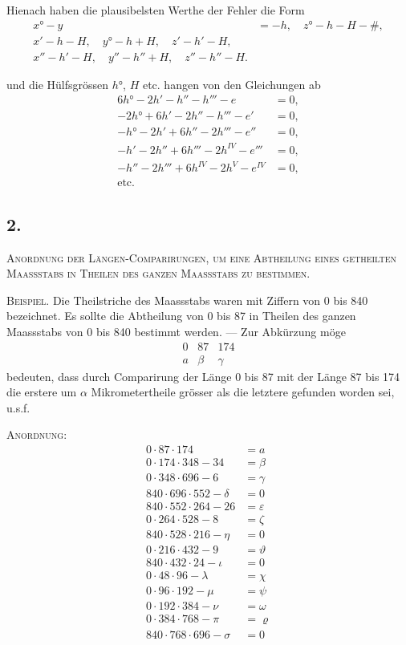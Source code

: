\documentclass[fontsize=10pt,paper=a5,pagesize=auto]{scrbook}
\newcommand{\origpage}[1]{\marginpar{\footnotesize\textit{S. #1}}}
\begin{document}
Hienach haben die plausibelsten Werthe der Fehler die Form
\begin{align*}
x° - y &= -h, \quad z° - h - H - \#,\\
x' - h - H, \quad y° - h + H, \quad z' - h' - H,\\
x'' - h' - H, \quad y'' - h'' + H, \quad z'' - h'' - H.
\end{align*}

\origpage{639}
und die Hülfsgrössen $h°$, $H$ etc. hangen von den Gleichungen ab
\begin{align*}
6h° - 2h' - h'' - h''' - e &= 0,\\
-2h° + 6h' - 2h'' - h''' - e' &= 0,\\
-h° - 2h' + 6h'' - 2h''' - e'' &= 0,\\
-h' - 2h'' + 6h''' - 2h^{IV} - e''' &= 0,\\
-h'' - 2h''' + 6h^{IV} - 2h^{V} - e^{IV} &= 0,\\
\text{etc.}&
\end{align*}

\subsection*{2.}
\origpage{639}
\textsc{Anordnung der Längen-Comparirungen, um eine Abtheilung eines getheilten Maassstabs in Theilen des ganzen Maassstabs zu bestimmen.}

\textsc{Beispiel.} Die Theilstriche des Maassstabs waren mit Ziffern von 0 bis 840 bezeichnet. Es sollte die Abtheilung von 0 bis 87 in Theilen des ganzen Maassstabs von 0 bis 840 bestimmt werden. --- Zur Abkürzung möge
\[
\begin{array}{ccc}
0 & 87 & 174 \\
\hline
a & \beta & \gamma
\end{array}
\]
bedeuten, dass durch Comparirung der Länge 0 bis 87 mit der Länge 87 bis 174 die erstere um $\alpha$ Mikrometertheile grösser als die letztere gefunden worden sei, u.s.f.

\textsc{Anordnung:}
\begin{align*}
0 \cdot 87 \cdot 174 &= a\\
0 \cdot 174 \cdot 348 - 34 &= \beta\\
0 \cdot 348 \cdot 696 - 6 &= \gamma\\
840 \cdot 696 \cdot 552 - \delta &= 0\\
840 \cdot 552 \cdot 264 - 26 &= \varepsilon\\
0 \cdot 264 \cdot 528 - 8 &= \zeta\\
840 \cdot 528 \cdot 216 - \eta &= 0\\
0 \cdot 216 \cdot 432 - 9 &= \vartheta\\
840 \cdot 432 \cdot 24 - \iota &= 0\\
0 \cdot 48 \cdot 96 - \lambda &= \chi\\
0 \cdot 96 \cdot 192 - \mu &= \psi\\
0 \cdot 192 \cdot 384 - \nu &= \omega\\
0 \cdot 384 \cdot 768 - \pi &= \varrho\\
840 \cdot 768 \cdot 696 - \sigma &= 0
\end{align*}
\end{document}
